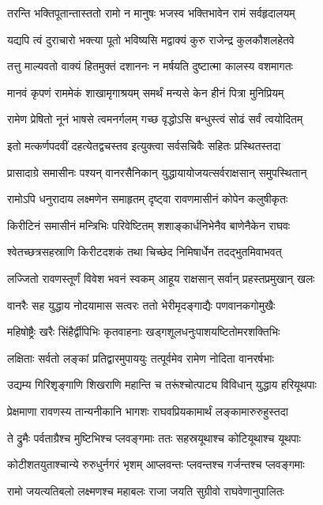 \twolineshloka
{तरन्ति भक्तिपूतान्तास्ततो रामो न मानुषः}
{भजस्व भक्तिभावेन रामं सर्वहृदालयम्} %

\twolineshloka
{यद्यपि त्वं दुराचारो भक्त्या पूतो भविष्यसि}
{मद्वाक्यं कुरु राजेन्द्र कुलकौशलहेतवे} %

\twolineshloka
{तत्तु माल्यवतो वाक्यं हितमुक्तं दशाननः}
{न मर्षयति दुष्टात्मा कालस्य वशमागतः} %

\twolineshloka
{मानवं कृपणं राममेकं शाखामृगाश्रयम्}
{समर्थं मन्यसे केन हीनं पित्रा मुनिप्रियम्} %

\twolineshloka
{रामेण प्रेषितो नूनं भाषसे त्वमनर्गलम्}
{गच्छ वृद्धोऽसि बन्धुस्त्वं सोढं सर्वं त्वयोदितम्} %

\twolineshloka
{इतो मत्कर्णपदवीं दहत्येतद्वचस्तव}
{इत्युक्त्वा सर्वसचिवैः सहितः प्रस्थितस्तदा} %

\twolineshloka
{प्रासादाग्रे समासीनः पश्यन् वानरसैनिकान्}
{युद्धायायोजयत्सर्वराक्षसान् समुपस्थितान्} %

\twolineshloka
{रामोऽपि धनुरादाय लक्ष्मणेन समाहृतम्}
{दृष्ट्वा रावणमासीनं कोपेन कलुषीकृतः} %

\twolineshloka
{किरीटिनं समासीनं मन्त्रिभिः परिवेष्टितम्}
{शशाङ्कार्धनिभेनैव बाणेनैकेन राघवः} %

\twolineshloka
{श्वेतच्छत्रसहस्राणि किरीटदशकं तथा}
{चिच्छेद निमिषार्धेन तदद्भुतमिवाभवत्} %

\twolineshloka
{लज्जितो रावणस्तूर्णं विवेश भवनं स्वकम्}
{आहूय राक्षसान् सर्वान् प्रहस्तप्रमुखान् खलः} %

\twolineshloka
{वानरैः सह युद्धाय नोदयामास सत्वरः}
{ततो भेरीमृदङ्गाद्यैः पणवानकगोमुखैः} %

\twolineshloka
{महिषोष्ट्रैः खरैः सिंहैर्द्वीपिभिः कृतवाहनाः}
{खड्गशूलधनुःपाशयष्टितोमरशक्तिभिः} %

\twolineshloka
{लक्षिताः सर्वतो लङ्कां प्रतिद्वारमुपाययुः}
{तत्पूर्वमेव रामेण नोदिता वानरर्षभाः} %

\twolineshloka
{उद्यम्य गिरिशृङ्गाणि शिखराणि महान्ति च}
{तरूंश्चोत्पाट्य विविधान् युद्धाय हरियूथपाः} %

\twolineshloka
{प्रेक्षमाणा रावणस्य तान्यनीकानि भागशः}
{राघवप्रियकामार्थं लङ्कामारुरुहुस्तदा} %

\twolineshloka
{ते द्रुमैः पर्वताग्रैश्च मुष्टिभिश्च प्लवङ्गमाः}
{ततः सहस्रयूथाश्च कोटियूथाश्च यूथपाः} %

\twolineshloka
{कोटीशतयुताश्चान्ये रुरुधुर्नगरं भृशम्}
{आप्लवन्तः प्लवन्तश्च गर्जन्तश्च प्लवङ्गमाः} %

\twolineshloka
{रामो जयत्यतिबलो लक्ष्मणश्च महाबलः}
{राजा जयति सुग्रीवो राघवेणानुपालितः} %

